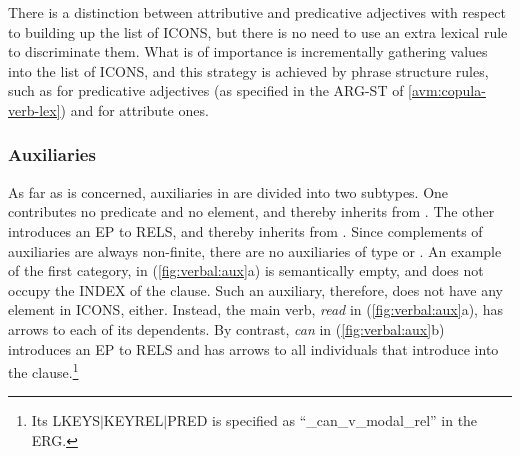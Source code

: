 There is a distinction between attributive and predicative adjectives
with respect to building up the list of ICONS, but there is no need to
use an extra lexical rule to discriminate them. What is of importance
is incrementally gathering  values into the list of
ICONS, and this strategy is achieved by phrase
structure rules, such as  for predicative
adjectives (as specified in the ARG-ST of \ref{avm:copula-verb-lex})
and  for attribute ones.



\subsubsection{Auxiliaries}
\label{10:ssssec:auxiliaries}





As far as  is concerned, auxiliaries in  are divided
into two subtypes. One contributes no predicate and no
 element, and thereby inherits from
.  The other introduces an EP to RELS, and
thereby inherits from . Since complements of
auxiliaries are always non-finite, there are no auxiliaries of type
 or . An
example of the first category,  in (\ref{fig:verbal:aux}a)
is semantically empty, and does not occupy the INDEX of the
clause. Such an auxiliary, therefore, does not have any 
element in ICONS, either. Instead, the main verb, \textit{read} in
(\ref{fig:verbal:aux}a), has arrows to each of its dependents. By
contrast, \textit{can} in (\ref{fig:verbal:aux}b) introduces an EP to
RELS and has arrows to all individuals that introduce 
into the clause.\footnote{Its LKEYS{$\mid$}KEYREL{$\mid$}PRED is
  specified as ``\_can\_v\_modal\_rel'' in the ERG.}



